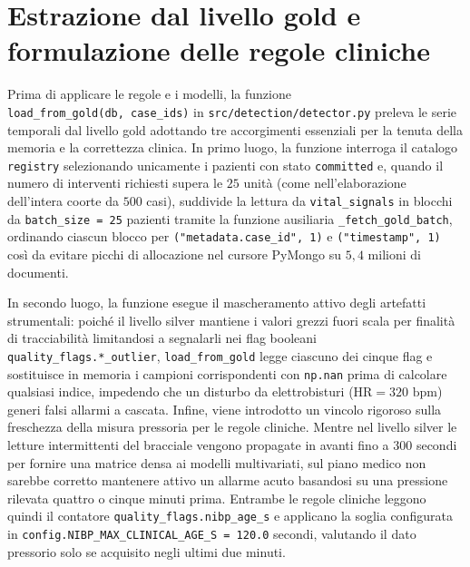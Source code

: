 \section{Estrazione dal livello gold e formulazione delle regole cliniche}
Prima di applicare le regole e i modelli, la funzione \texttt{load\_\allowbreak from\_\allowbreak gold(db,\allowbreak\ case\_ids)} in \texttt{src/\allowbreak detection/\allowbreak detector.py} preleva le serie temporali dal livello gold adottando tre accorgimenti essenziali per la tenuta della memoria e la correttezza clinica. In primo luogo, la funzione interroga il catalogo \texttt{registry} selezionando unicamente i pazienti con stato \texttt{committed} e, quando il numero di interventi richiesti supera le $25$ unit\`a (come nell'elaborazione dell'intera coorte da $500$ casi), suddivide la lettura da \texttt{vital\_signals} in blocchi da \texttt{batch\_size = 25} pazienti tramite la funzione ausiliaria \texttt{\_fetch\_\allowbreak gold\_batch}, ordinando ciascun blocco per \texttt{("metadata.case\_id", 1)} e \texttt{("timestamp", 1)} cos\`i da evitare picchi di allocazione nel cursore PyMongo su $5,4$ milioni di documenti.

In secondo luogo, la funzione esegue il mascheramento attivo degli artefatti strumentali: poich\'e il livello silver mantiene i valori grezzi fuori scala per finalit\`a di tracciabilit\`a limitandosi a segnalarli nei flag booleani \texttt{quality\_\allowbreak flags.*\_outlier}, \texttt{load\_\allowbreak from\_gold} legge ciascuno dei cinque flag e sostituisce in memoria i campioni corrispondenti con \texttt{np.nan} prima di calcolare qualsiasi indice, impedendo che un disturbo da elettrobisturi ($\text{HR} = 320\text{ bpm}$) generi falsi allarmi a cascata. Infine, viene introdotto un vincolo rigoroso sulla freschezza della misura pressoria per le regole cliniche. Mentre nel livello silver le letture intermittenti del bracciale vengono propagate in avanti fino a $300$ secondi per fornire una matrice densa ai modelli multivariati, sul piano medico non sarebbe corretto mantenere attivo un allarme acuto basandosi su una pressione rilevata quattro o cinque minuti prima. Entrambe le regole cliniche leggono quindi il contatore \texttt{quality\_\allowbreak flags.\allowbreak nibp\_age\_s} e applicano la soglia configurata in \texttt{config.\allowbreak NIBP\_\allowbreak MAX\_\allowbreak CLINICAL\_\allowbreak AGE\_S = 120.0} secondi, valutando il dato pressorio solo se acquisito negli ultimi due minuti.

